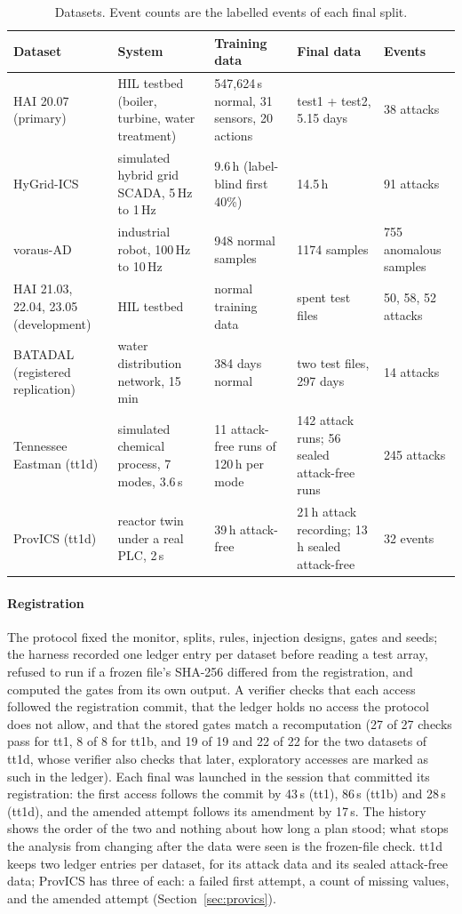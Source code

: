 \documentclass[sigconf]{acmart}
\begin{document}
\begin{table}[t]
\caption{Datasets. Event counts are the labelled events of each final split.}
\label{tab:data}
\begin{tabularx}{\textwidth}{@{}LLLLL@{}}
\toprule
Dataset & System & Training data & Final data & Events \\
\midrule
HAI 20.07 (primary) & HIL testbed (boiler, turbine, water treatment) & 547,624\,s normal, 31 sensors, 20 actions & test1 + test2, 5.15 days & 38 attacks \\
HyGrid-ICS & simulated hybrid grid SCADA, 5\,Hz to 1\,Hz & 9.6\,h (label-blind first 40\%) & 14.5\,h & 91 attacks \\
voraus-AD & industrial robot, 100\,Hz to 10\,Hz & 948 normal samples & 1174 samples & 755 anomalous samples \\
HAI 21.03, 22.04, 23.05 (development) & HIL testbed & normal training data & spent test files & 50, 58, 52 attacks \\
BATADAL (registered replication) & water distribution network, 15\,min & 384 days normal & two test files, 297 days & 14 attacks \\
Tennessee Eastman (tt1d) & simulated chemical process, 7 modes, 3.6\,s & 11 attack-free runs of 120\,h per mode & 142 attack runs; 56 sealed attack-free runs & 245 attacks \\
ProvICS (tt1d) & reactor twin under a real PLC, 2\,s & 39\,h attack-free & 21\,h attack recording; 13\,h sealed attack-free & 32 events \\
\bottomrule
\end{tabularx}
\end{table}

\paragraph{Registration}
The protocol fixed the monitor, splits, rules, injection designs, gates and seeds; the harness
recorded one ledger entry per dataset before reading a test array, refused to run if a frozen file's
SHA-256 differed from the registration, and computed the gates from its own output. A verifier
checks that each access followed the registration commit, that the ledger holds no access the
protocol does not allow, and that the stored gates match a recomputation (27 of 27 checks pass for
tt1, 8 of 8 for tt1b, and 19 of 19 and 22 of 22 for the two datasets of tt1d, whose verifier also
checks that later, exploratory accesses are marked as such in the ledger). Each final was launched
in the session that committed its registration: the first access follows the commit by 43\,s (tt1),
86\,s (tt1b) and 28\,s (tt1d), and the amended attempt follows its amendment by 17\,s. The history shows
the order of the two and nothing about how long a plan stood; what stops the analysis from changing
after the data were seen is the frozen-file check. tt1d keeps two ledger
entries per dataset, for its attack data and its sealed attack-free data; ProvICS has three of each: a
failed first attempt, a count of missing values, and the amended attempt (Section~\ref{sec:provics}).
\end{document}
